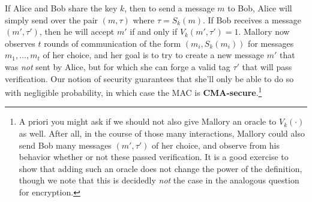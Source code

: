 \hypertarget{MACdef}{}

If Alice and Bob share the key \(k\), then to send a message \(m\) to
Bob, Alice will simply send over the pair \((m,\tau)\) where
\(\tau = S_k(m)\). If Bob receives a message \((m',\tau')\), then he
will accept \(m'\) if and only if \(V_k(m',\tau')=1\). Mallory now
observes \(t\) rounds of communication of the form \((m_i,S_k(m_i))\)
for messages \(m_1,\ldots,m_t\) of her choice, and her goal is to try to
create a new message \(m'\) that was \emph{not} sent by Alice, but for
which she can forge a valid tag \(\tau'\) that will pass verification.
Our notion of security guarantees that she'll only be able to do so with
negligible probability, in which case the MAC is
\textbf{CMA-secure}.\footnote{A priori you might ask if we should not
  also give Mallory an oracle to \(V_k(\cdot)\) as well. After all, in
  the course of those many interactions, Mallory could also send Bob
  many messages \((m',\tau')\) of her choice, and observe from his
  behavior whether or not these passed verification. It is a good
  exercise to show that adding such an oracle does not change the power
  of the definition, though we note that this is decidedly \emph{not}
  the case in the analogous question for encryption.}

